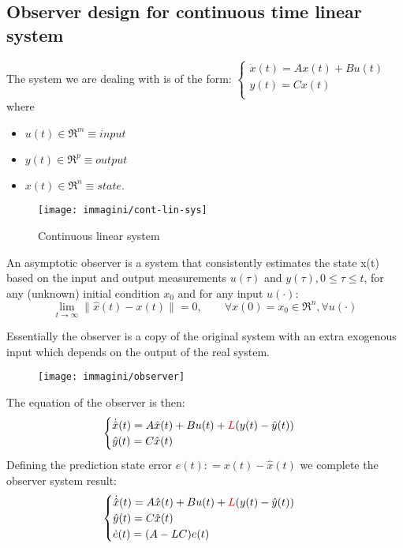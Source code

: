 \subsection{Observer design for continuous time linear system}
The system we are dealing with is of the form:
$\begin{cases} 
	\dot{x}(t)=Ax(t)+Bu(t)\\
	y(t)=Cx(t)\\
\end{cases}$
where 
\begin{itemize}
	\item[] $u(t)\in \Re^m \equiv input$
	\item[] $y(t)\in \Re^p \equiv output$
	\item[] $x(t)\in \Re^n \equiv state$.
\end{itemize}
	\begin{figure}[H]
	\centering
	\texttt{[image: immagini/cont-lin-sys]}
	\caption{Continuous linear system}
	\label{fig:cont-lin-sys}
\end{figure}
\begin{defn}
	An asymptotic observer is a system that consistently estimates the state x(t) based on the input and output measurements $u(\tau)$ and $y(\tau), 0 \le \tau \le t$, for any (unknown) initial condition $x_0$ and for any input $u(\cdot):$
	\[
	\lim_{t\rightarrow \infty}\|\hat{x}(t)-x(t)\|=0, \qquad \forall x(0)=x_0\in \Re^n, \forall u(\cdot)
	\]
\end{defn}
Essentially the observer is a copy of the original system with an extra exogenous input which depends on the output of the real system.
\begin{figure}[H]
	\centering
	\texttt{[image: immagini/observer]}
	\caption[Asymptotic observer]{}
	\label{fig:observer}
\end{figure}
The equation of the observer is then:
\[
\begin{cases} 
	\dot{\hat{x}}(t)=A\hat{x}(t)+Bu(t)+\textcolor{red}{L}(y(t)-\hat{y}(t))\\
	\hat{y}(t)=C\hat{x}(t)\\
\end{cases}
\]
Defining the prediction state error $e(t)\colon= x(t)-\hat{x}(t)$ we complete the observer system result:
\[
\begin{cases} 
	\dot{\hat{x}}(t)=A\hat{x}(t)+Bu(t)+\textcolor{red}{L}(y(t)-\hat{y}(t))\\
	\hat{y}(t)=C\hat{x}(t)\\
	\dot{e}(t)=(A-LC)e(t)\\
\end{cases}
\]
